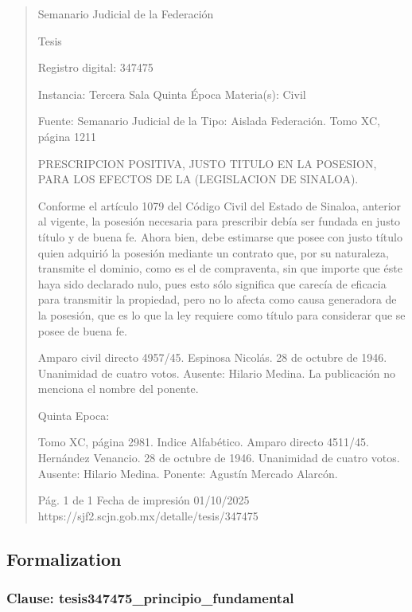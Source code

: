 \documentclass[11pt,a4paper]{article}
\begin{document}
\begin{quote}
                                                   Semanario Judicial de la Federación

                                                  Tesis

 Registro digital: 347475

 Instancia: Tercera Sala          Quinta Época                          Materia(s): Civil

                                  Fuente: Semanario Judicial de la      Tipo: Aislada
                                  Federación.
                                  Tomo XC, página 1211


PRESCRIPCION POSITIVA, JUSTO TITULO EN LA POSESION, PARA LOS EFECTOS DE LA
(LEGISLACION DE SINALOA).


Conforme el artículo 1079 del Código Civil del Estado de Sinaloa, anterior al vigente, la posesión
necesaria para prescribir debía ser fundada en justo título y de buena fe. Ahora bien, debe
estimarse que posee con justo título quien adquirió la posesión mediante un contrato que, por su
naturaleza, transmite el dominio, como es el de compraventa, sin que importe que éste haya sido
declarado nulo, pues esto sólo significa que carecía de eficacia para transmitir la propiedad, pero no
lo afecta como causa generadora de la posesión, que es lo que la ley requiere como título para
considerar que se posee de buena fe.


Amparo civil directo 4957/45. Espinosa Nicolás. 28 de octubre de 1946. Unanimidad de cuatro
votos. Ausente: Hilario Medina. La publicación no menciona el nombre del ponente.

Quinta Epoca:

Tomo XC, página 2981. Indice Alfabético. Amparo directo 4511/45. Hernández Venancio. 28 de
octubre de 1946. Unanimidad de cuatro votos. Ausente: Hilario Medina. Ponente: Agustín Mercado
Alarcón.




                                             Pág. 1 de 1             Fecha de impresión 01/10/2025
  https://sjf2.scjn.gob.mx/detalle/tesis/347475

\end{quote}

\subsection{Formalization}

\subsubsection{Clause: tesis347475\_principio\_fundamental}
\end{document}
